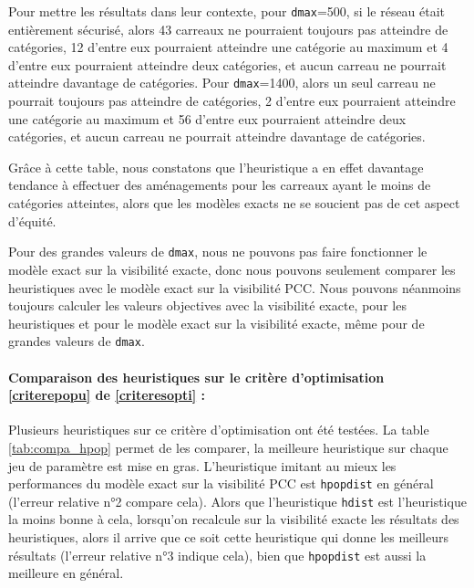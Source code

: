 Pour mettre les résultats dans leur contexte, pour \verb|dmax|=500, si le réseau était entièrement sécurisé, alors 43 carreaux ne pourraient toujours pas atteindre de catégories, 12 d'entre eux pourraient atteindre une catégorie au maximum et 4 d'entre eux pourraient atteindre deux catégories, et aucun carreau ne pourrait atteindre davantage de catégories. Pour \verb|dmax|=1400, alors un seul carreau ne pourrait toujours pas atteindre de catégories, 2 d'entre eux pourraient atteindre une catégorie au maximum et 56 d'entre eux pourraient atteindre deux catégories, et aucun carreau ne pourrait atteindre davantage de catégories.

Grâce à cette table, nous constatons que l'heuristique a en effet davantage tendance à effectuer des aménagements pour les carreaux ayant le moins de catégories atteintes, alors que les modèles exacts ne se soucient pas de cet aspect d'équité.

Pour des grandes valeurs de \verb|dmax|, nous ne pouvons pas faire fonctionner le modèle exact sur la visibilité exacte, donc nous pouvons seulement comparer les heuristiques avec le modèle exact sur la visibilité PCC. Nous pouvons néanmoins toujours calculer les valeurs objectives avec la visibilité exacte, pour les heuristiques et pour le modèle exact sur la visibilité exacte, même pour de grandes valeurs de \verb|dmax|. %



\paragraph{Comparaison des heuristiques sur le critère d'optimisation \ref{criterepopu} de \ref{criteresopti} :}

Plusieurs heuristiques sur ce critère d'optimisation ont été testées. La table \ref{tab:compa_hpop} permet de les comparer, la meilleure heuristique sur chaque jeu de paramètre est mise en gras. L'heuristique imitant au mieux les performances du modèle exact sur la visibilité PCC est \verb|hpopdist| en général (l'erreur relative n°2 compare cela). Alors que l'heuristique \verb|hdist| est l'heuristique la moins bonne à cela, lorsqu'on recalcule sur la visibilité exacte les résultats des heuristiques, alors il arrive que ce soit cette heuristique qui donne les meilleurs résultats (l'erreur relative n°3 indique cela), bien que \verb|hpopdist| est aussi la meilleure en général.

